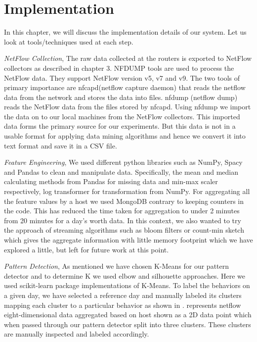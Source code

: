 \label{key}%

\chapter{Implementation} \label{implementation}

In this chapter, we will discuss the implementation details of our system. Let us look at tools/techniques used at each step.  

\textit{NetFlow Collection},  The raw data collected at the routers is exported to NetFlow collectors as described in chapter 3. NFDUMP \cite{haag2005watch} tools are used to process the NetFlow data. They support NetFlow version v5, v7 and v9. The two tools of primary importance are nfcapd(netflow capture daemon) that reads the netflow data from the network and stores the data into files. nfdump (netflow dump) reads the NetFlow data from the files stored by nfcapd. Using nfdump we import the data on to our local machines
from the NetFlow collectors. This imported data forms the
primary source for our experiments. But this data is not in a usable format for applying data mining algorithms and hence we convert it into text format and save it in a CSV file.

\textit{Feature Engineering}, We used different python libraries such as NumPy, Spacy and Pandas to clean and manipulate data. Specifically, the mean and median calculating methods from Pandas for missing data and min-max scaler respectively, log transformer for transformation from NumPy. For aggregating all the feature values by a host we used MongoDB contrary to keeping counters in the code. This has reduced the time taken  for aggregation to under 2 minutes from 20 minutes for a day's worth data. In this context, we also wanted to try the approach of streaming algorithms such as bloom filters or count-min sketch which gives the aggregate information with little memory footprint which we have explored a little, but left for future work at this point.

\textit{Pattern Detection}, As mentioned we have chosen K-Means for our pattern detector and to determine K we used elbow and silhouette approaches. Here we used scikit-learn package implementations of K-Means. To label the behaviors on a given day, we have selected a reference day and manually labeled its clusters mapping each cluster to a particular behavior as shown in .  represents netflow eight-dimensional data aggregated based on host shown as a 2D data point which when passed through our pattern detector split into three clusters. These clusters are manually inspected and labeled accordingly.

